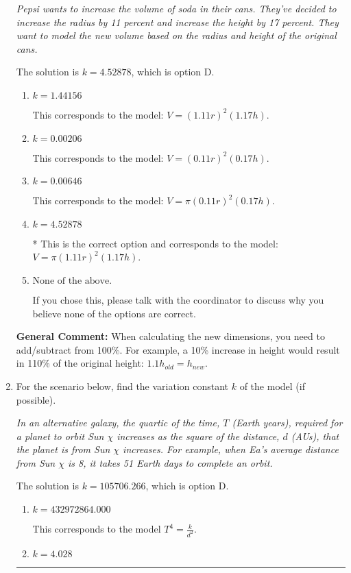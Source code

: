 \documentclass{extbook}[14pt]
\newcommand{\litem}[1]{\item #1

\rule{\textwidth}{0.4pt}}
\begin{document}
\begin{enumerate}
{\begin{center}
    \textit{ Pepsi wants to increase the volume of soda in their cans. They've decided to increase the radius by 11 percent and increase the height by 17 percent. They want to model the new volume based on the radius and height of the original cans. }
\end{center}
The solution is \( k = 4.52878 \), which is option D.\begin{enumerate}[label=\Alph*.]
\item \( k = 1.44156 \)

This corresponds to the model: $V = (1.11 r)^2 (1.17 h)$.
\item \( k = 0.00206 \)

This corresponds to the model: $V = (0.11 r)^2 (0.17 h)$.
\item \( k = 0.00646 \)

This corresponds to the model: $V = \pi (0.11 r)^2 (0.17 h)$.
\item \( k = 4.52878 \)

* This is the correct option and corresponds to the model: $V = \pi (1.11 r)^2 (1.17 h)$.
\item \( \text{None of the above.} \)

If you chose this, please talk with the coordinator to discuss why you believe none of the options are correct.
\end{enumerate}

\textbf{General Comment:} When calculating the new dimensions, you need to add/subtract from 100\%. For example, a 10\% increase in height would result in 110\% of the original height: $1.1h_{old} = h_{new}$.
}
\litem{
For the scenario below, find the variation constant $k$ of the model (if possible).

\begin{center}
    \textit{ In an alternative galaxy, the quartic of the time, $T$ (Earth years), required for a planet to orbit Sun $\chi$ increases as the square of the distance, $d$ (AUs), that the planet is from Sun $\chi$ increases. For example, when Ea's average distance from Sun $\chi$ is 8, it takes 51 Earth days to complete an orbit. }
\end{center}
The solution is \( k = 105706.266 \), which is option D.\begin{enumerate}[label=\Alph*.]
\item \( k = 432972864.000 \)

This corresponds to the model $T^{4} = \frac{k}{d^{2}}$.
\item \( k = 4.028 \)


\end{enumerate}}
\end{enumerate}
\end{document}
